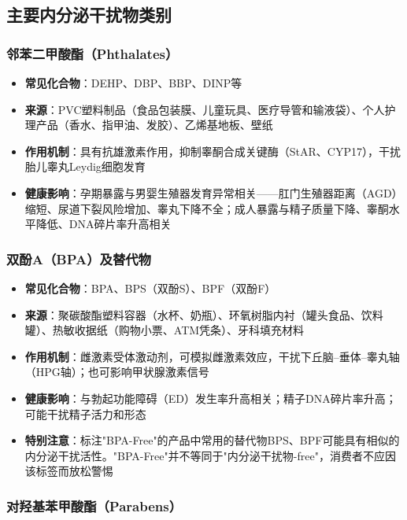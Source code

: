 \subsection{主要内分泌干扰物类别}

\subsubsection{邻苯二甲酸酯（Phthalates）}

\begin{itemize}[leftmargin=2cm]
	\item \textbf{常见化合物}：DEHP、DBP、BBP、DINP等
	\item \textbf{来源}：PVC塑料制品（食品包装膜、儿童玩具、医疗导管和输液袋）、个人护理产品（香水、指甲油、发胶）、乙烯基地板、壁纸
	\item \textbf{作用机制}：具有抗雄激素作用，抑制睾酮合成关键酶（StAR、CYP17），干扰胎儿睾丸Leydig细胞发育
	\item \textbf{健康影响}：孕期暴露与男婴生殖器发育异常相关——肛门生殖器距离（AGD）缩短、尿道下裂风险增加、睾丸下降不全；成人暴露与精子质量下降、睾酮水平降低、DNA碎片率升高相关
\end{itemize}

\subsubsection{双酚A（BPA）及替代物}

\begin{itemize}[leftmargin=2cm]
	\item \textbf{常见化合物}：BPA、BPS（双酚S）、BPF（双酚F）
	\item \textbf{来源}：聚碳酸酯塑料容器（水杯、奶瓶）、环氧树脂内衬（罐头食品、饮料罐）、热敏收据纸（购物小票、ATM凭条）、牙科填充材料
	\item \textbf{作用机制}：雌激素受体激动剂，可模拟雌激素效应，干扰下丘脑--垂体--睾丸轴（HPG轴）；也可影响甲状腺激素信号
	\item \textbf{健康影响}：与勃起功能障碍（ED）发生率升高相关；精子DNA碎片率升高；可能干扰精子活力和形态
	\item \textbf{特别注意}：标注"BPA-Free"的产品中常用的替代物BPS、BPF可能具有相似的内分泌干扰活性。"BPA-Free"并不等同于"内分泌干扰物-free"，消费者不应因该标签而放松警惕
\end{itemize}

\subsubsection{对羟基苯甲酸酯（Parabens）}

